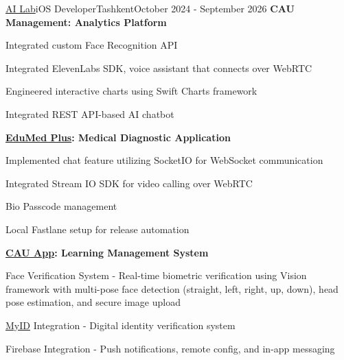 \begin{resume_employer}{\href{https://www.linkedin.com/company/ai-lab-centralasian}{AI Lab}}{iOS Developer}{Tashkent}{October 2024 - September 2026}
\textbf{CAU Management: Analytics Platform}
\item 
\item Integrated custom Face Recognition API
\item Integrated ElevenLabs SDK, voice assistant that connects over WebRTC
\item Engineered interactive charts using Swift Charts framework
\item Integrated REST API-based AI chatbot

\vspace{\projectspacing}

\textbf{\href{https://apps.apple.com/uz/app/edumed-plus/id6757598366}{EduMed Plus}: Medical Diagnostic Application}
\item Implemented chat feature utilizing SocketIO for WebSocket communication
\item Integrated Stream IO SDK for video calling over WebRTC
\item Bio Passcode management
\item Local Fastlane setup for release automation   

\vspace{\projectspacing}

\textbf{\href{https://apps.apple.com/uz/app/eduplus-cau/id6670467558}{CAU App}: Learning Management System}
\item Face Verification System - Real-time biometric verification using Vision framework with multi-pose face detection (straight, left, right, up, down), head pose estimation, and secure image upload
\item \href{https://docs.myid.uz/#/en/sdknew}{MyID} Integration - Digital identity verification system 
\item  Firebase Integration - Push notifications, remote config, and in-app messaging

\ailabminorprojects
\end{resume_employer}
